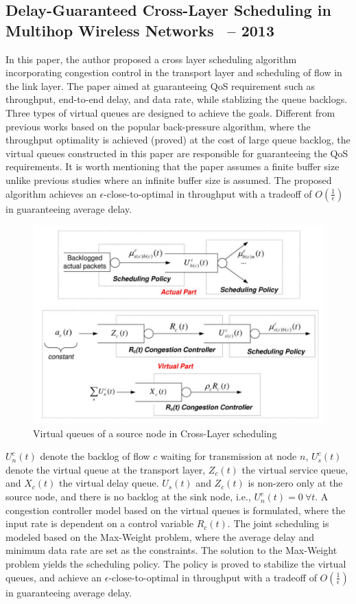 \documentclass[12pt]{article}
\begin{document}
\subsection{Delay-Guaranteed Cross-Layer Scheduling in Multihop Wireless Networks~\cite{xue2012delay} -- 2013}
In this paper, the author proposed a cross layer scheduling algorithm incorporating congestion control in the transport layer and scheduling of flow in the link layer. The paper aimed at guaranteeing QoS requirement such as throughput, end-to-end delay, and data rate, while stablizing the queue backlogs. Three types of virtual queues are designed to achieve the goals. Different from previous works based on the popular back-pressure algorithm, where the throughput optimality is achieved (proved) at the cost of large queue backlog, the virtual queues constructed in this paper are responsible for guaranteeing the QoS requirements. It is worth mentioning that the paper assumes a finite buffer size unlike previous studies where an infinite buffer size is assumed.
The proposed algorithm achieves an $\epsilon$-close-to-optimal in throughput with a tradeoff of $O(\frac{1}{\epsilon})$ in guaranteeing average delay. 

\begin{figure}
    \centering
    \includegraphics[width = 0.7\columnwidth]{Figures/CorssLayer.png}
    \caption{Virtual queues of a source node in Cross-Layer scheduling}
    \label{fig:crossLayer}
\end{figure}

$U^c_n(t)$ denote the backlog of flow $c$ waiting for transmission at node $n$, $U^c_s(t)$ denote the virtual queue at the transport layer, $Z_c(t)$ the virtual service queue, and $X_c(t)$ the virtual delay queue. $U_s(t)$ and $Z_c(t)$ is non-zero only at the source node, and there is no backlog at the sink node, i.e., $U^c_n(t) = 0 ~ \forall t$.  A congestion controller model based on the virtual queues is formulated, where the input rate is dependent on a control variable $R_c(t)$. The joint scheduling is modeled based on the Max-Weight problem, where the average delay and minimum data rate are set as the constraints. The solution to the Max-Weight problem yields the scheduling policy. The policy is proved to stabilize the virtual queues, and achieve an $\epsilon$-close-to-optimal in throughput with a tradeoff of $O(\frac{1}{\epsilon})$ in guaranteeing average delay. 
\end{document}
